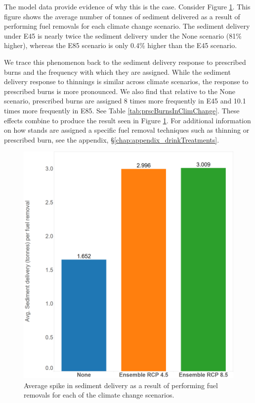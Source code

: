 The model data provide evidence of why this is the case. Consider Figure \ref{fig:avgSedimentDelivery}. This figure shows the average number of tonnes of sediment delivered as a result of performing fuel removals for each climate change scenario. The sediment delivery under E45 is nearly twice the sediment delivery under the None scenario (81\% higher), whereas the E85 scenario is only 0.4\% higher than the E45 scenario.

We trace this phenomenon back to the sediment delivery response to prescribed burns and the frequency with which they are assigned. While the sediment delivery response to thinnings is similar across climate scenarios, the response to prescribed burns is more pronounced. We also find that relative to the None scenario, prescribed burns are assigned 8 times more frequently in E45 and 10.1 times more frequently in E85. See Table \ref{tab:prscBurnsInClimChange}. These effects combine to produce the result seen in Figure \ref{fig:avgSedimentDelivery}. For additional information on how stands are assigned a specific fuel removal techniques such as thinning or prescribed burn, see the appendix, \S \ref{chap:appendix_drinkTreatments}.

\begin{figure}[ht]
\centering
\includegraphics[width=.55\textwidth]{../images/AvgSedimentSpikes}
\caption[Average sediment delivery across climate scenarios]{Average spike in sediment delivery as a result of performing fuel removals for each of the climate change scenarios.}
\label{fig:avgSedimentDelivery}
\end{figure}

